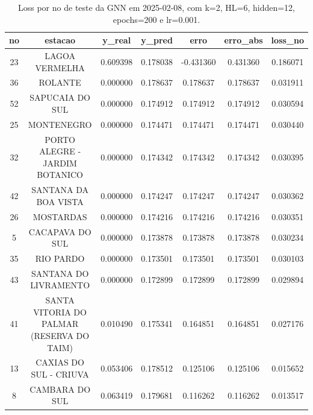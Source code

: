 \begin{table}[h]
\centering
\caption{Loss por no de teste da GNN em 2025-02-08, com k=2, HL=6, hidden=12, epochs=200 e lr=0.001.}
\label{tab:gnn_loss_k2_hl6_h12_e200_d20250208}
\begin{tabular}{ccccccc}
\toprule
no & estacao & y\_real & y\_pred & erro & erro\_abs & loss\_no \\
\midrule
23 & LAGOA VERMELHA & 0.609398 & 0.178038 & -0.431360 & 0.431360 & 0.186071 \\
36 & ROLANTE & 0.000000 & 0.178637 & 0.178637 & 0.178637 & 0.031911 \\
52 & SAPUCAIA DO SUL & 0.000000 & 0.174912 & 0.174912 & 0.174912 & 0.030594 \\
25 & MONTENEGRO & 0.000000 & 0.174471 & 0.174471 & 0.174471 & 0.030440 \\
32 & PORTO ALEGRE - JARDIM BOTANICO & 0.000000 & 0.174342 & 0.174342 & 0.174342 & 0.030395 \\
42 & SANTANA DA BOA VISTA & 0.000000 & 0.174247 & 0.174247 & 0.174247 & 0.030362 \\
26 & MOSTARDAS & 0.000000 & 0.174216 & 0.174216 & 0.174216 & 0.030351 \\
5 & CACAPAVA DO SUL & 0.000000 & 0.173878 & 0.173878 & 0.173878 & 0.030234 \\
35 & RIO PARDO & 0.000000 & 0.173501 & 0.173501 & 0.173501 & 0.030103 \\
43 & SANTANA DO LIVRAMENTO & 0.000000 & 0.172899 & 0.172899 & 0.172899 & 0.029894 \\
41 & SANTA VITORIA DO PALMAR (RESERVA DO TAIM) & 0.010490 & 0.175341 & 0.164851 & 0.164851 & 0.027176 \\
13 & CAXIAS DO SUL - CRIUVA & 0.053406 & 0.178512 & 0.125106 & 0.125106 & 0.015652 \\
8 & CAMBARA DO SUL & 0.063419 & 0.179681 & 0.116262 & 0.116262 & 0.013517 \\
\bottomrule
\end{tabular}
\end{table}

